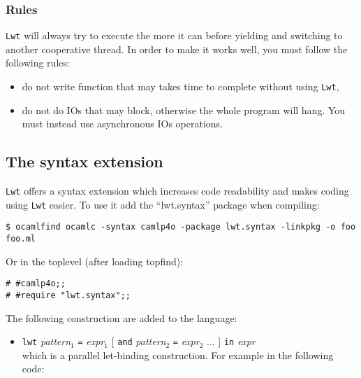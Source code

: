 \subsubsection{ Rules }

{\tt Lwt} will always try to execute the more it can before yielding and
switching to another cooperative thread. In order to make it works well,
you must follow the following rules:



\begin{itemize}
\item  do not write function that may takes time to complete without
using {\tt Lwt},
\item  do not do IOs that may block, otherwise the whole program will
hang. You must instead use asynchronous IOs operations.

\end{itemize}

\subsection{ The syntax extension }

{\tt Lwt} offers a syntax extension which increases code readability and
makes coding using {\tt Lwt} easier.  To use it add the ``lwt.syntax'' package when
compiling:



\lstset{language=[Objective]Caml}\begin{lstlisting}
$ ocamlfind ocamlc -syntax camlp4o -package lwt.syntax -linkpkg -o foo foo.ml

\end{lstlisting}
Or in the toplevel (after loading topfind):



\lstset{language=[Objective]Caml}\begin{lstlisting}
# #camlp4o;;
# #require "lwt.syntax";;

\end{lstlisting}
The following construction are added to the language:



\begin{itemize}
\item  {\tt lwt} \emph{pattern$_{\mbox{1}}$} {\tt =} \emph{expr$_{\mbox{1}}$} [ {\tt and}
\emph{pattern$_{\mbox{2}}$} {\tt =} \emph{expr$_{\mbox{2}}$} ... ] {\tt in} \emph{expr}
\mbox{}\\
which is a parallel let-binding construction. For example in the
following code:

\end{itemize}

